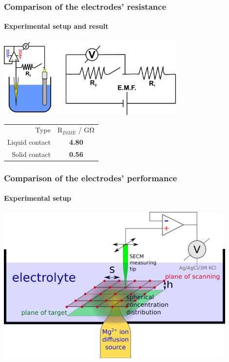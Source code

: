 \documentclass{beamer}
\begin{document}
\begin{frame}
\frametitle{Comparison of the electrodes' resistance}
\framesubtitle{Experimental setup and result}
\begin{center}
\includegraphics[width=0.7\textwidth]{divider_switch.jpg}
\vfill
\begin{table}
                \centering
                \begin{tabular}{r c}
                        Type & R$_{ISME}$ / G$\ohm$ \\
			\cline{1-2}
			Liquid contact & \textbf{\textcolor{white!100}{\colorbox{red!100}{4.80}}} \\
                        Solid contact &  \textbf{\textcolor{black!100}{\colorbox{green!100}{0.56}}} \\

                \end{tabular}
\end{table}
\end{center}
\end{frame}

\begin{frame}
\frametitle{Comparison of the electrodes' performance}
\framesubtitle{Experimental setup}
\begin{center}
\includegraphics[width=0.9\textwidth]{setup.eps}
\end{center}
\end{frame}
\end{document}
